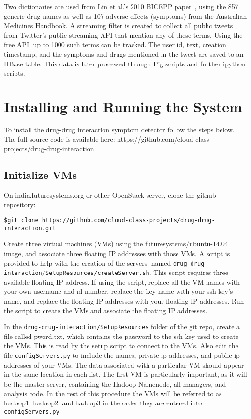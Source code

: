 \documentclass[letterpaper]{article}
\begin{document}
Two dictionaries are used from Lin et al.'s 2010 BICEPP paper~\citep{lin2011bicepp}, using the 857 generic drug names as well as 107 adverse effects (symptoms) from the Australian Medicines Handbook. A streaming filter is created to collect all public tweets from Twitter's public streaming API that mention any of these terms. Using the free API, up to 1000 such terms can be tracked. The user id, text, creation timestamp, and the symptoms and drugs mentioned in the tweet are saved to an HBase table. This data is later processed through Pig scripts and further ipython scripts. 

\section{Installing and Running the System}

To install the drug-drug interaction symptom detector follow the steps below. The full source code is available here: https://github.com/cloud-class-projects/drug-drug-interaction

\subsection{Initialize VMs} 
On india.futuresystems.org or other OpenStack server, clone the github repository: \
\begin{lstlisting}
$git clone https://github.com/cloud-class-projects/drug-drug-interaction.git
\end{lstlisting}

Create three virtual machines (VMs) using the futuresystems/ubuntu-14.04 image, and associate three floating IP addresses with those VMs. A script is provided to help with the creation of the servers, named \lstinline|drug-drug-interaction/SetupResources/createServer.sh|. This script requires three available floating IP address. If using the script, replace all the VM names with your own username and id number, replace the key name with your ssh key's name, and replace the floating-IP addresses with your floating IP addresses. Run the script to create the VMs and associate the floating IP addresses.

In the \lstinline|drug-drug-interaction/SetupResources| folder of the git repo, create a file called pword.txt, which contains the password to the ssh key used to create the VMs. This is read by the setup script to connect to the VMs. Also edit the file \lstinline|configServers.py| to include the names, private ip addresses, and public ip addresses of your VMs. The data associated with a particular VM should appear in the same location in each list. The first VM is particularly important, as it will be the master server, containing the Hadoop Namenode, all managers, and analysis code. In the rest of this procedure the VMs will be referred to as hadoop1, hadoop2, and hadoop3 in the order they are entered into \lstinline|configServers.py|
\end{document}
